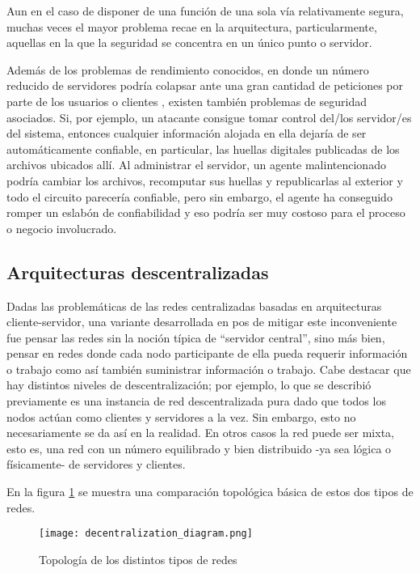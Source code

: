 Aun en el caso de disponer de una función de una sola vía relativamente segura, muchas veces el mayor problema recae en la arquitectura, particularmente, aquellas en la que la seguridad se concentra en un único punto o servidor.

Además de los problemas de rendimiento conocidos, en donde un número reducido de servidores podría colapsar ante una gran cantidad de peticiones por parte de los usuarios o clientes \cite{NeilsonWoodside1995}, existen también problemas de seguridad asociados. Si, por ejemplo, un atacante consigue tomar control del/los servidor/es del sistema, entonces cualquier información alojada en ella dejaría de ser automáticamente confiable, en particular, las huellas digitales publicadas de los archivos ubicados allí. Al administrar el servidor, un agente malintencionado podría cambiar los archivos, recomputar sus huellas y republicarlas al exterior y todo el circuito parecería confiable, pero sin embargo, el agente ha conseguido romper un eslabón de confiabilidad y eso podría ser muy costoso para el proceso o negocio involucrado.

\subsection{Arquitecturas descentralizadas}

Dadas las problemáticas de las redes centralizadas basadas en arquitecturas cliente-servidor, una variante desarrollada en pos de mitigar este inconveniente fue pensar las redes sin la noción típica de ``servidor central'', sino más bien, pensar en redes donde cada nodo participante de ella pueda requerir información o trabajo como así también suministrar información o trabajo. Cabe destacar que hay distintos niveles de descentralización; por ejemplo, lo que se describió previamente es una instancia de red descentralizada pura dado que todos los nodos actúan como clientes y servidores a la vez. Sin embargo, esto no necesariamente se da así en la realidad. En otros casos la red puede ser mixta, esto es, una red con un número equilibrado y bien distribuido -ya sea lógica o físicamente- de servidores y clientes.

En la figura \ref{fig:topologia-tipo-redes} se muestra una comparación topológica básica de estos dos tipos de redes.

\begin{figure}[H]
  \texttt{[image: decentralization\_diagram.png]}
  \centering
  \caption{Topología de los distintos tipos de redes}
  \label{fig:topologia-tipo-redes}
\end{figure}

